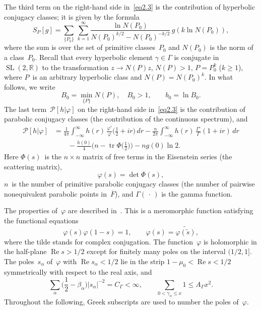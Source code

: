\documentclass{amsart}
\theoremstyle{plain}
\theoremstyle{definition}
\numberwithin{equation}{section}
\begin{document}
The third term on the right-hand side in~\eqref{eq2.3} is the
contribution of hyperbolic conjugacy classes; it is given by the
formula
\begin{equation}
\label{eq2.6}
S_P[g]=\sum_{\{P_0\}}\,\sum_{k=1}^\infty
\frac{\ln N(P_0)}{N(P_0)^{k/2}-N(P_0)^{-k/2}}\,g(k\ln N(P_0)),
\end{equation}
where the sum is over the set of primitive classes~$P_0$ and
$N(P_0)$ is the norm of a class~$P_0$. Recall that every hyperbolic
element $\gamma\in\Gamma$ is conjugate
in~$\operatorname{SL}(2,\mathbb{R})$ to the transformation $z\to
N(P)z$, $N(P)>1$, $P=P_0^k$ ($k\geqslant1$), where $P$~is an
arbitrary hyperbolic class and $N(P)=N(P_0)^k$. In what follows, we
write
\begin{equation}
\label{eq2.7}
B_0=\min_{\{P\}}N(P),\quad
B_0>1,\qquad
b_0=\ln B_0.
\end{equation}
The last term~$\mathscr{P}[h|\varphi]$ on the right-hand side
in~\eqref{eq2.3} is the contribution of parabolic conjugacy classes
(the contribution of the continuous spectrum), and
\begin{equation}\label{eq2.8}
\begin{split}
\mathscr{P}[h|\varphi]&=\frac{1}{4\pi}\int_{-\infty}^\infty h(r)\,
\frac{\varphi'}{\varphi}\biggl(\frac{1}{2}+ir\biggr)\,dr-
\frac{n}{2\pi}\int_{-\infty}^\infty
h(r)\,\frac{\Gamma'}{\Gamma}(1+ir)\,dr
\\
&\qquad-\frac{h(0)}{4}\biggl(n-\operatorname{tr}\Phi\biggl(\frac12\biggr)\biggr)-ng(0)\ln2.
\end{split}
\end{equation}
Here $\Phi(s)$~is the $n\times n$ matrix of free terms in the
Eisenstein series (the scattering matrix),
\begin{equation}
\label{eq2.9}
\varphi(s)=\det\Phi(s),
\end{equation}
$n$~is the number of primitive parabolic conjugacy classes (the
number of pairwise nonequivalent parabolic points
in~$\overline{F}$), and $\Gamma(\,\cdot\,)$ is the gamma function.

The properties of~$\varphi$ are described in~\cite{1,3,12,17}. This
is a meromorphic function satisfying the functional equations
\begin{equation}
\label{eq2.10}
\varphi(s)\varphi(1-s)=1,\qquad
\varphi(s)=\widetilde{\varphi(\tilde s)},
\end{equation}
where the tilde stands for complex conjugation. The
function~$\varphi$ is holomorphic in the half-plane
$\operatorname{Re}s>1/2$ except for finitely many poles on the
interval $(1/2,1]$. The poles~$s_\alpha$ of~$\varphi$ with
$\operatorname{Re}s_\alpha<1/2$ lie in the strip
$1-\mu_0<\operatorname{Re}s<1/2$ symmetrically with respect to the
real axis, and
\begin{equation}
\label{eq2.11}
\sum_\alpha\biggl(\frac{1}{2}-\beta_\alpha\biggr)|s_\alpha|^{-2}=
C_\Gamma<\infty,\qquad
\sum_{0<\gamma_\alpha\leqslant x}1\leqslant A_\Gamma x^2.
\end{equation}
Throughout the following, Greek subscripts are used to number the
poles of~$\varphi$.
\end{document}
